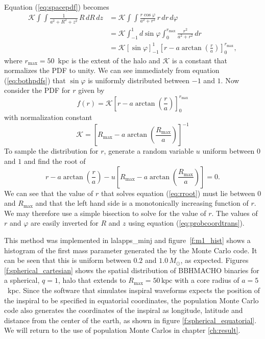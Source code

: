 Equation (\ref{eq:spacepdf}) becomes
\begin{equation}
\begin{split}
\mathcal{K} \int\int \frac{1}{a^2 + R^2 + z^2}\,R\, dR\, dz 
&= \mathcal{K} \int\int \frac{r\cos\varphi}{a^2+r^2}\,r\, dr \, d\varphi \\
&= \mathcal{K} \int_{-1}^{1} d\sin\varphi \int_0^{r_{\mathrm{max}}} \frac{r^2}{a^2+r^2}\, dr \\
&= \mathcal{K} \left[\sin\varphi\right]_{-1}^1 \left[r -
a\arctan\left(\frac{r}{a}\right)\right]_0^{r_{\mathrm{max}}},
\end{split}
\label{eq:bothpdfs}
\end{equation}
where $r_\mathrm{max} = 50$~kpc is the extent of the halo and $\mathcal{K}$ is
a constant that normalizes the PDF to unity. We can see immediately from
equation (\ref{eq:bothpdfs}) that $\sin\varphi$ is uniformly
distributed between $-1$ and $1$. Now consider the PDF for $r$ given by
\begin{equation}
f(r) = \mathcal{K} \left[r - a\arctan\left(\frac{r}{a}\right)\right]_0^{r_{\mathrm{max}}}
\end{equation}
with normalization constant
\begin{equation}
\mathcal{K} = 
\left[R_\mathrm{max} -
a\arctan\left(\frac{R_\mathrm{max}}{a}\right)\right]^{-1}
\end{equation}
To sample the distribution for $r$, generate a random variable $u$
uniform between $0$ and $1$ and find the root of
\begin{equation}
r - a\arctan\left(\frac{r}{a}\right) - u \left[R_\mathrm{max} -
a\arctan\left(\frac{R_\mathrm{max}}{a}\right)\right] = 0.
\label{eq:rroot}
\end{equation}
We can see that the value of $r$ that solves equation (\ref{eq:rroot}) must
lie between $0$ and $R_\mathrm{max}$ and that the left hand side is a
monotonically increasing function of $r$. We may therefore use a simple 
bisection to solve for the value of $r$. The values of $r$
and $\varphi$ are easily inverted for $R$ and $z$ using equation
(\ref{eq:probcoordtrans}). 

This method was implemented in lalapps\_minj and figure~\ref{f:m1_hist} shows
a histogram of the first mass parameter generated the by the Monte Carlo code.
It can be seen that this is uniform between $0.2$ and $1.0\,M_\odot$, as
expected. Figures \ref{f:spherical_cartesian} shows the spatial distribution
of BBHMACHO binaries for a spherical, $q=1$, halo that extends to
$R_\mathrm{max} = 50\,\mathrm{kpc}$ with a core radius of $a = 5$~kpc.  Since
the software that simulates inspiral waveforms expects the position of the
inspiral to be specified in equatorial coordinates, the population Monte Carlo
code also generates the coordinates of the inspiral as longitude, latitude and
distance from the center of the earth, as shown in figure
\ref{f:spherical_equatorial}.  We will return to the use of population Monte
Carlos in chapter \ref{ch:result}.

